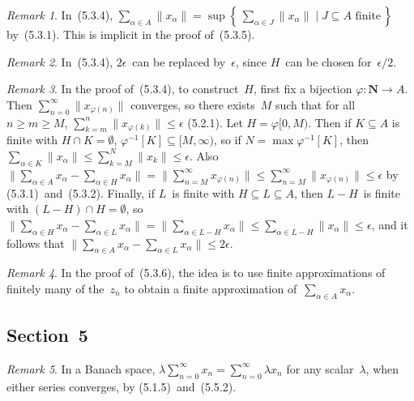 \documentclass[letterpaper,12pt]{article}
\newcommand{\N}{\mathbf{N}}
\newcommand{\sect}{\cap}
\newcommand{\inv}[1]{#1^{-1}}
\newcommand{\norm}[1]{\lVert{#1}\rVert}
\theoremstyle{plain}
\theoremstyle{definition}
\theoremstyle{remark}
\newtheorem*{rmk}{Remark}
\begin{document}
\begin{rmk}
In~(5.3.4), \(\sum_{\alpha\in A}\norm{x_{\alpha}}=\sup\left\{\,\sum_{\alpha\in J}\norm{x_{\alpha}}\mid J\subseteq A\text{ finite}\,\right\}\) by~(5.3.1). This is implicit in the proof of~(5.3.5).
\end{rmk}

\begin{rmk}
In~(5.3.4), \(2\epsilon\)~can be replaced by~\(\epsilon\), since \(H\)~can be chosen for~\(\epsilon/2\).
\end{rmk}

\begin{rmk}
In the proof of~(5.3.4), to construct~\(H\), first fix a bijection \(\varphi:\N\to A\). Then \(\sum_{n=0}^{\infty}\norm{x_{\varphi(n)}}\) converges, so there exists~\(M\) such that for all \(n\ge m\ge M\), \(\sum_{k=m}^n\norm{x_{\varphi(k)}}\le\epsilon\) (5.2.1). Let \(H=\varphi[0,M)\). Then if \(K\subseteq A\) is finite with \(H\sect K=\emptyset\), \(\inv{\varphi}[K]\subseteq[M,\infty)\), so if \(N=\max\inv{\varphi}[K]\), then \(\sum_{\alpha\in K}\norm{x_{\alpha}}\le\sum_{k=M}^N\norm{x_k}\le\epsilon\). Also \(\norm{\sum_{\alpha\in A}x_{\alpha}-\sum_{\alpha\in H}x_{\alpha}}=\norm{\sum_{n=M}^{\infty}x_{\varphi(n)}}\le\sum_{n=M}^{\infty}\norm{x_{\varphi(n)}}\le\epsilon\) by (5.3.1)~and~(5.3.2). Finally, if \(L\)~is finite with \(H\subseteq L\subseteq A\), then \(L-H\)~is finite with \((L-H)\sect H=\emptyset\), so \(\norm{\sum_{\alpha\in H}x_{\alpha}-\sum_{\alpha\in L}x_{\alpha}}=\norm{\sum_{\alpha\in L-H}x_{\alpha}}\le\sum_{\alpha\in L-H}\norm{x_{\alpha}}\le\epsilon\), and it follows that \(\norm{\sum_{\alpha\in A}x_{\alpha}-\sum_{\alpha\in L}x_{\alpha}}\le 2\epsilon\).
\end{rmk}

\begin{rmk}
In the proof of~(5.3.6), the idea is to use finite approximations of finitely many of the~\(z_n\) to obtain a finite approximation of~\(\sum_{\alpha\in A}x_\alpha\).
\end{rmk}

\subsection*{Section~5}
\begin{rmk}
In a Banach space, \(\lambda\sum_{n=0}^{\infty}x_n=\sum_{n=0}^{\infty}\lambda x_n\) for any scalar~\(\lambda\), when either series converges, by (5.1.5)~and~(5.5.2).
\end{rmk}
\end{document}
